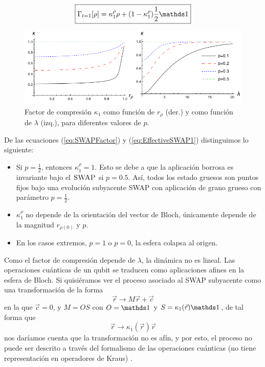 \begin{equation}\label{eq:EffectiveSWAP1}
  \boxed{\Gamma_{t=1}[\rho]=\kappa_{1}^{\rho}\rho+(1-\kappa_{1}^{\rho})\frac{1}{2}\Id}
\end{equation}
\begin{figure}[h!]
  \centering
  \includegraphics[width=0.9\linewidth]{chapter3/figures_toy/ContractionFactorSWAP_2D_both.png}
  \caption{Factor de compresión $\kappa_{1}$ como función de $r_{\rho}$ (der.) y como función de $\lambda$ (izq.), para diferentes valores de $p$.}
  \label{fig:SWAPFactor2Drl}
\end{figure}

De las ecuaciones (\ref{eq:SWAPFactor}) y (\ref{eq:EffectiveSWAP1}) distinguimos lo siguiente:
\begin{itemize}
  \item Si $p=\frac{1}{2}$, entonces $\kappa_{1}^{\rho}=1$. Esto se debe a que la aplicación borrosa es invariante bajo el $\textsc{SWAP}$ si $p=0.5$. Así, todos los estado gruesos son puntos fijos bajo una evolución subyacente SWAP con aplicación de grano grueso con parámetro $p=\frac{1}{2}$.
  \item $\kappa_{1}^{\rho}$ no depende de la orientación del vector de Bloch, únicamente depende de la magnitud $r_{\rho(0)}$ y $p$.
  \item En los casos extremos, $p=1$ o $p=0$, la esfera colapsa al origen.
\end{itemize}


Como el factor de compresión depende de $\lambda$, la dinámica no es lineal. Las operaciones cuánticas de un qubit se traducen como aplicaciones afines en la esfera de Bloch. Si quisiéramos ver el proceso asociado al \textsc{SWAP} subyacente como una transformación de la forma
\begin{equation*}
  \vec{r}\rightarrow M\vec{r}+\vec{c}
\end{equation*}
en la que $\vec{c}=0$, y $M=OS$ con $O=\Id$ y $S=\kappa_{1}(\vec{r})\Id$, de tal forma que
\begin{equation*}
  \vec{r}\rightarrow \kappa_{1}(\vec{r})\vec{r}
\end{equation*}
nos daríamos cuenta que la transformación no es afín, y por esto, el proceso no puede ser descrito a través del formalismo de las operaciones cuánticas (no tiene representación en operadores de Kraus) \cite{Chuang}.

